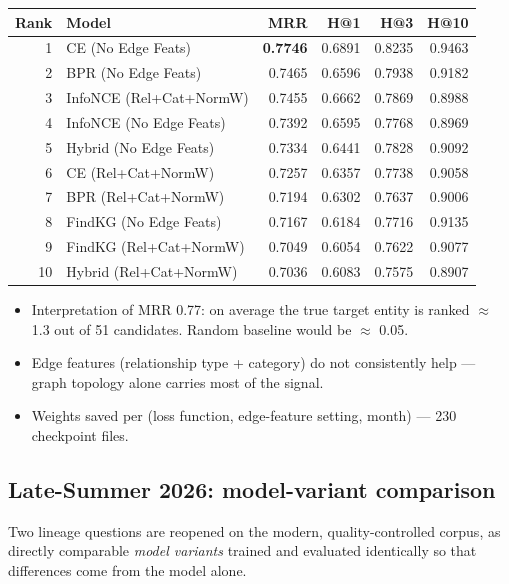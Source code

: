 \documentclass[11pt]{article}
\begin{document}
\begin{center}
\begin{tabular}{rlrrrr}
\toprule
\textbf{Rank} & \textbf{Model} & \textbf{MRR} & \textbf{H@1} & \textbf{H@3} & \textbf{H@10} \\
\midrule
1  & CE (No Edge Feats)       & \textbf{0.7746} & 0.6891 & 0.8235 & 0.9463 \\
2  & BPR (No Edge Feats)      & 0.7465 & 0.6596 & 0.7938 & 0.9182 \\
3  & InfoNCE (Rel+Cat+NormW)  & 0.7455 & 0.6662 & 0.7869 & 0.8988 \\
4  & InfoNCE (No Edge Feats)  & 0.7392 & 0.6595 & 0.7768 & 0.8969 \\
5  & Hybrid (No Edge Feats)   & 0.7334 & 0.6441 & 0.7828 & 0.9092 \\
6  & CE (Rel+Cat+NormW)       & 0.7257 & 0.6357 & 0.7738 & 0.9058 \\
7  & BPR (Rel+Cat+NormW)      & 0.7194 & 0.6302 & 0.7637 & 0.9006 \\
8  & FindKG (No Edge Feats)   & 0.7167 & 0.6184 & 0.7716 & 0.9135 \\
9  & FindKG (Rel+Cat+NormW)   & 0.7049 & 0.6054 & 0.7622 & 0.9077 \\
10 & Hybrid (Rel+Cat+NormW)   & 0.7036 & 0.6083 & 0.7575 & 0.8907 \\
\bottomrule
\end{tabular}
\end{center}

\begin{itemize}
  \item Interpretation of MRR 0.77: on average the true target entity is ranked \(\approx\) 1.3 out of 51 candidates. Random baseline would be \(\approx\) 0.05.
  \item Edge features (relationship type + category) do not consistently help --- graph topology alone carries most of the signal.
  \item Weights saved per (loss function, edge-feature setting, month) --- 230 checkpoint files.
\end{itemize}

\subsection{Late-Summer 2026: model-variant comparison}
Two lineage questions are reopened on the modern, quality-controlled corpus, as directly comparable \emph{model variants} trained and evaluated identically so that differences come from the model alone.
\end{document}
